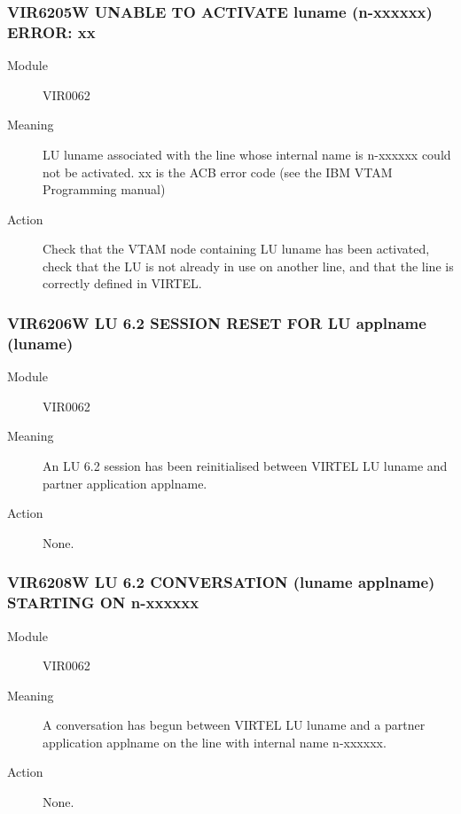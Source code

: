 \documentclass[letterpaper,10pt,english]{sphinxmanual}
\begin{document}
\subsubsection{VIR6205W UNABLE TO ACTIVATE luname (n-xxxxxx) ERROR: xx}
\label{\detokenize{messages:vir6205w-unable-to-activate-luname-n-xxxxxx-error-xx}}\begin{description}
\item[{Module}] \leavevmode
VIR0062

\item[{Meaning}] \leavevmode
LU luname associated with the line whose internal name is n-xxxxxx could not be activated. xx is the ACB error code (see the IBM VTAM Programming manual)

\item[{Action}] \leavevmode
Check that the VTAM node containing LU luname has been activated, check that the LU is not already in use on another line, and that the line is correctly defined in VIRTEL.

\end{description}


\subsubsection{VIR6206W LU 6.2 SESSION RESET FOR LU applname (luname)}
\label{\detokenize{messages:vir6206w-lu-6-2-session-reset-for-lu-applname-luname}}\begin{description}
\item[{Module}] \leavevmode
VIR0062

\item[{Meaning}] \leavevmode
An LU 6.2 session has been reinitialised between VIRTEL LU luname and partner application applname.

\item[{Action}] \leavevmode
None.

\end{description}


\subsubsection{VIR6208W LU 6.2 CONVERSATION (luname \textendash{} applname) STARTING ON n-xxxxxx}
\label{\detokenize{messages:vir6208w-lu-6-2-conversation-luname-applname-starting-on-n-xxxxxx}}\begin{description}
\item[{Module}] \leavevmode
VIR0062

\item[{Meaning}] \leavevmode
A conversation has begun between VIRTEL LU luname and a partner application applname on the line with internal name n-xxxxxx.

\item[{Action}] \leavevmode
None.

\end{description}
\end{document}
